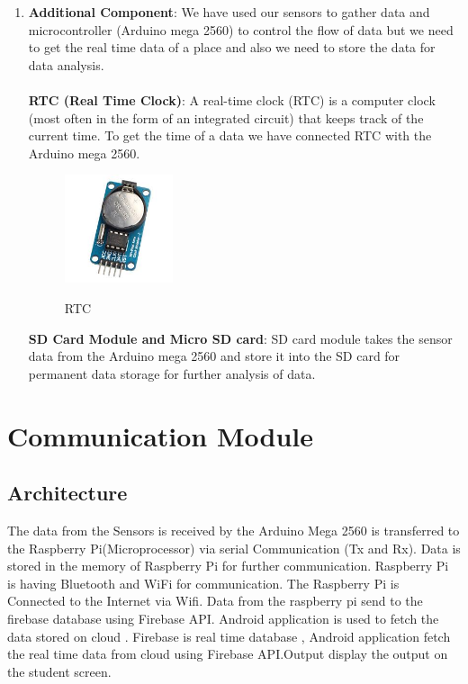 \begin{enumerate}
\item \textbf{Additional Component}:
We have used our sensors to gather data and microcontroller (Arduino mega 2560) to control the flow of data but we need to get the real time data of a place and also we need to store the data for data analysis.
\\
\\
\textbf{RTC (Real Time Clock)}: A real-time clock (RTC) is a computer clock (most often in the form of an integrated circuit) that keeps track of the current time. To get the time of a data we have connected RTC with the Arduino mega 2560.
\begin{figure}
\centering
\includegraphics[width=0.3\textwidth]{./rtc}\\[0.1in]
\label{fig: RTC}
\caption{RTC}
\end{figure}

\textbf{SD Card Module and Micro SD card}: SD card module takes the sensor data from the Arduino mega 2560 and store it into the SD card for permanent data storage for further analysis of data. 
\end{enumerate}




\section{Communication Module}
\subsection{Architecture}
The data from the Sensors is received by the Arduino Mega 2560 is transferred to the Raspberry Pi(Microprocessor) via serial Communication (Tx and Rx). Data is stored in the memory of Raspberry Pi for further communication. Raspberry Pi is having Bluetooth and WiFi for communication. The Raspberry Pi is Connected to the Internet via Wifi. Data from the raspberry pi send to the firebase database using Firebase API.
Android application is used to fetch the data stored on cloud . Firebase is real time database , Android application fetch the real time data from cloud using Firebase API.Output display the output on the student screen.  

